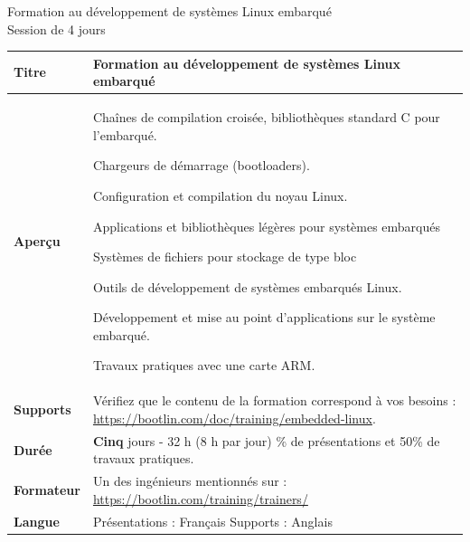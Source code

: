 \documentclass[a4paper,12pt,obeyspaces,spaces,hyphens]{article}
\begin{document}
\thispagestyle{fancy}

\setlength{\arrayrulewidth}{0.8pt}

\begin{center}
\LARGE
Formation au développement de systèmes Linux embarqué\\
\large
Session de 4 jours
\end{center}
\vspace{1cm}

\small
{}

 {
  \begin{tabularx}{\textwidth}{|g|h|}
    {\bf Titre} & {\bf Formation au développement de systèmes Linux embarqué} \\
    \hline

    {\bf Aperçu} &
Chaînes de compilation croisée, bibliothèques standard C pour l'embarqué. \par
Chargeurs de démarrage (bootloaders). \par
Configuration et compilation du noyau Linux. \par
Applications et bibliothèques légères pour systèmes embarqués \par
Systèmes de fichiers pour stockage de type bloc \par
Outils de développement de systèmes embarqués Linux. \par
Développement et mise au point d'applications sur le système embarqué. \par
Travaux pratiques avec une carte ARM. \\
    \hline
    {\bf Supports} &
    Vérifiez que le contenu de la formation correspond à vos besoins :
    \newline \url{https://bootlin.com/doc/training/embedded-linux}. \\
    \hline

    {\bf Durée} & {\bf Cinq} jours - 32 h (8 h par jour)
    \% de présentations et 50\% de travaux pratiques. \\
    \hline

    {\bf Formateur} & Un des ingénieurs mentionnés sur :
    \newline \url{https://bootlin.com/training/trainers/}\\
    \hline

    {\bf Langue} & Présentations : Français
    \newline Supports : Anglais\\
    \hline


\end{tabularx}}
\end{document}
